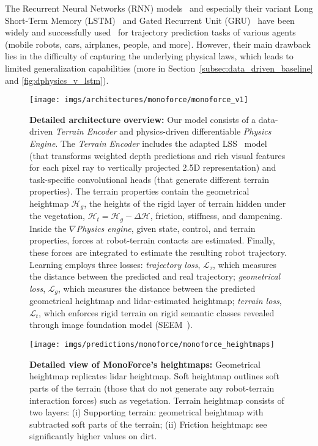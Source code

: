 The Recurrent Neural Networks (RNN) models~\cite{rumelhart1986learning} and
especially their variant Long Short-Term Memory (LSTM)~\cite{hochreiter1997long} and
Gated Recurrent Unit (GRU)~\cite{cho2014learning} have been widely and
successfully used~\cite{xie2020motion, yoon2022trajectory, pang2019aircraft}
for trajectory prediction tasks of various agents (mobile robots, cars, airplanes, people, and more).
However, their main drawback lies in the difficulty of capturing the underlying physical laws,
which leads to limited generalization capabilities
(more in Section~\ref{subsec:data_driven_baseline} and \autoref{fig:dphysics_v_lstm}).

\begin{figure*}[th]
    \centering
    \texttt{[image: imgs/architectures/monoforce/monoforce\_v1]}
    \caption{\textbf{Detailed architecture overview:} Our model consists of a data-driven \emph{Terrain Encoder} and physics-driven differentiable \emph{Physics Engine}. The \emph{Terrain Encoder} includes the adapted LSS~\cite{philion2020lift} model (that transforms weighted depth predictions
    and rich visual features for each pixel ray to vertically
    projected 2.5D representation) and task-specific convolutional heads (that generate different terrain properties).
    The terrain properties contain the geometrical heightmap $\mathcal{H}_{g}$, the heights of the rigid layer of terrain hidden
    under the vegetation, $\mathcal{H}_{t} = \mathcal{H}_{g} - \Delta\mathcal{H}$, friction, stiffness, and dampening.
    Inside the \emph{$\nabla$Physics engine}, given state, control, and terrain properties, forces at robot-terrain contacts are estimated.
    Finally, these forces are integrated to estimate the resulting robot trajectory.
    Learning employs three losses: \emph{trajectory loss}, $\mathcal{L}_{\tau}$, which measures the distance between
    the predicted and real trajectory; \emph{geometrical loss}, $\mathcal{L}_g$, which measures the distance between
    the predicted geometrical heightmap and lidar-estimated heightmap;
    \emph{terrain loss}, $\mathcal{L}_t$, which enforces rigid terrain on rigid semantic classes revealed through image foundation model (SEEM~\cite{zou2023segment}).
    }
    \label{fig:monoforce}
\end{figure*}

\begin{figure}[h]
    \centering
    \texttt{[image: imgs/predictions/monoforce/monoforce\_heightmaps]}
    \caption{\textbf{Detailed view of MonoForce's heightmaps:} Geometrical heightmap replicates lidar heightmap. Soft heightmap outlines soft parts of the terrain (those that do not generate any robot-terrain interaction forces) such as vegetation. Terrain heightmap consists of two layers: (i) Supporting terrain: geometrical heightmap with subtracted soft parts of the terrain; (ii) Friction heightmap: see significantly higher values on dirt.
    }
    \label{fig:monoforce_heightmaps}
\end{figure}

